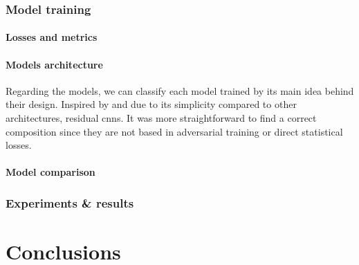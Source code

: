 \documentclass[11pt, a4paper]{article}
\begin{document}
	\section{Model training}
	\subsection{Losses and metrics}
	
	\subsection{Models architecture}
	Regarding the models, we can classify each model trained by its main idea behind their design. Inspired by \cite{Meraner2020} and due to its simplicity compared to other architectures, residual \gls{cnn}s. It was more straightforward to find a correct composition since they are not based in adversarial training or direct statistical losses. 
	\subsection{Model comparison}
	\newpage
	\section{Experiments \& results}
	\newpage
	\part{Conclusions}
	\newpage
	
	
	\newpage
	
	
\end{document}
